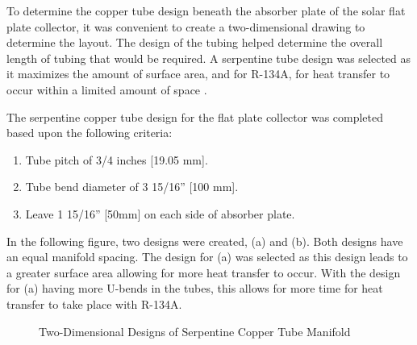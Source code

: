 To determine the copper tube design beneath the absorber plate of the solar flat plate collector, it was convenient to create a two-dimensional drawing to determine the layout. The design of the tubing helped determine the overall length of tubing that would be required. A serpentine tube design was selected as it maximizes the amount of surface area, and for R-134A, for heat transfer to occur within a limited amount of space \cite{serpentine_bending}.

\medskip
The serpentine copper tube design for the flat plate collector was completed based upon the following criteria:

\medskip
\begin{enumerate}[itemsep=3mm, parsep=-1mm, label=\roman*.]
    \item Tube pitch of 3/4 inches [19.05 mm].
    \item Tube bend diameter of 3 15/16” [100 mm].
    \item Leave 1 15/16” [50mm] on each side of absorber plate.
\end{enumerate}

\medskip
In the following figure, two designs were created, (a) and (b). Both designs have an equal manifold spacing. The design for (a) was selected as this design leads to a greater surface area allowing for more heat transfer to occur. With the design for (a) having more U-bends in the tubes, this allows for more time for heat transfer to take place with R-134A. 

\begin{figure}[ht]
    \centering
    \qquad
    \caption{Two-Dimensional Designs of Serpentine Copper Tube Manifold}
\end{figure}

